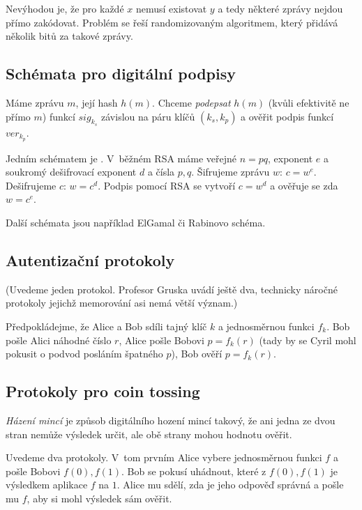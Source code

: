 Nevýhodou je, že pro každé $x$ nemusí existovat $y$ a tedy některé
zprávy nejdou přímo zakódovat. Problém se řeší randomizovaným
algoritmem, který přidává několik bitů za takové zprávy.

\subsection{Schémata pro digitální podpisy}

Máme zprávu $m$, její hash $h(m)$. Chceme {\em podepsat} $h(m)$ (kvůli
efektivitě ne přímo $m$) funkcí $sig_{k_s}$ závislou na páru klíčů $(k_s,
k_p)$ a ověřit podpis funkcí $ver_{k_p}$.

Jedním schématem je . V~běžném RSA máme veřejné $n = pq$,
exponent $e$ a soukromý dešifrovací exponent $d$ a čísla $p,q$.
Šifrujeme zprávu $w$: $c = w^e$. Dešifrujeme $c$: $w = c^d$.
Podpis pomocí RSA se vytvoří $c = w^d$ a ověřuje se zda $w = c^e$.

Další schémata jsou například ElGamal či Rabinovo schéma.

\subsection{Autentizační protokoly}

(Uvedeme jeden protokol. Profesor Gruska uvádí ještě dva, technicky
náročné protokoly jejichž memorování asi nemá větší význam.)

\begin{example}
Předpokládejme, že Alice a Bob sdíli tajný klíč $k$ a jednosměrnou
funkci $f_k$. Bob pošle Alici náhodné číslo $r$, Alice pošle Bobovi
$p = f_k(r)$ (tady by se Cyril mohl pokusit o podvod posláním špatného
$p$), Bob ověří $p = f_k(r)$.
\end{example}

\subsection{Protokoly pro coin tossing}

{\em Házení mincí} je způsob digitálního hození mincí takový, že ani
jedna ze dvou stran nemůže výsledek určit, ale obě strany mohou hodnotu
ověřit.

Uvedeme dva protokoly. V~tom prvním Alice vybere jednosměrnou funkci $f$
a pošle Bobovi $f(0), f(1)$. Bob se pokusí uhádnout, které z $f(0), f(1)$
je výsledkem aplikace $f$ na $1$. Alice mu sdělí, zda je jeho odpověď
správná a pošle mu $f$, aby si mohl výsledek sám ověřit.


